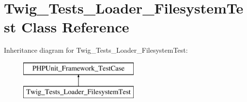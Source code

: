 \hypertarget{classTwig__Tests__Loader__FilesystemTest}{}\section{Twig\+\_\+\+Tests\+\_\+\+Loader\+\_\+\+Filesystem\+Test Class Reference}
\label{classTwig__Tests__Loader__FilesystemTest}
Inheritance diagram for Twig\+\_\+\+Tests\+\_\+\+Loader\+\_\+\+Filesystem\+Test\+:\begin{figure}[H]
\begin{center}
\leavevmode
\includegraphics[height=2.000000cm]{classTwig__Tests__Loader__FilesystemTest}
\end{center}
\end{figure}
